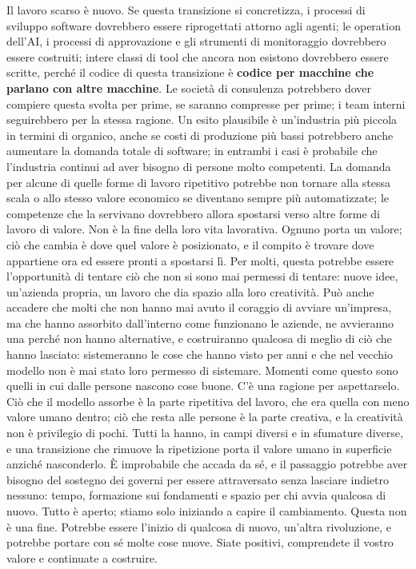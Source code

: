 \documentclass[10pt,oneside,openany]{book}
\begin{document}
Il lavoro scarso è nuovo. Se questa transizione si concretizza, i processi di sviluppo software dovrebbero essere riprogettati attorno agli agenti; le operation dell'AI, i processi di approvazione e gli strumenti di monitoraggio dovrebbero essere costruiti; intere classi di tool che ancora non esistono dovrebbero essere scritte, perché il codice di questa transizione è \textbf{codice per macchine che parlano con altre macchine}. Le società di consulenza potrebbero dover compiere questa svolta per prime, se saranno compresse per prime; i team interni seguirebbero per la stessa ragione. Un esito plausibile è un'industria più piccola in termini di organico, anche se costi di produzione più bassi potrebbero anche aumentare la domanda totale di software; in entrambi i casi è probabile che l'industria continui ad aver bisogno di persone molto competenti. La domanda per alcune di quelle forme di lavoro ripetitivo potrebbe non tornare alla stessa scala o allo stesso valore economico se diventano sempre più automatizzate; le competenze che la servivano dovrebbero allora spostarsi verso altre forme di lavoro di valore. Non è la fine della loro vita lavorativa. Ognuno porta un valore; ciò che cambia è dove quel valore è posizionato, e il compito è trovare dove appartiene ora ed essere pronti a spostarsi lì. Per molti, questa potrebbe essere l'opportunità di tentare ciò che non si sono mai permessi di tentare: nuove idee, un'azienda propria, un lavoro che dia spazio alla loro creatività. Può anche accadere che molti che non hanno mai avuto il coraggio di avviare un'impresa, ma che hanno assorbito dall'interno come funzionano le aziende, ne avvieranno una perché non hanno alternative, e costruiranno qualcosa di meglio di ciò che hanno lasciato: sistemeranno le cose che hanno visto per anni e che nel vecchio modello non è mai stato loro permesso di sistemare. Momenti come questo sono quelli in cui dalle persone nascono cose buone. C'è una ragione per aspettarselo. Ciò che il modello assorbe è la parte ripetitiva del lavoro, che era quella con meno valore umano dentro; ciò che resta alle persone è la parte creativa, e la creatività non è privilegio di pochi. Tutti la hanno, in campi diversi e in sfumature diverse, e una transizione che rimuove la ripetizione porta il valore umano in superficie anziché nasconderlo. È improbabile che accada da sé, e il passaggio potrebbe aver bisogno del sostegno dei governi per essere attraversato senza lasciare indietro nessuno: tempo, formazione sui fondamenti e spazio per chi avvia qualcosa di nuovo. Tutto è aperto; stiamo solo iniziando a capire il cambiamento. Questa non è una fine. Potrebbe essere l'inizio di qualcosa di nuovo, un'altra rivoluzione, e potrebbe portare con sé molte cose nuove. Siate positivi, comprendete il vostro valore e continuate a costruire.
\end{document}
